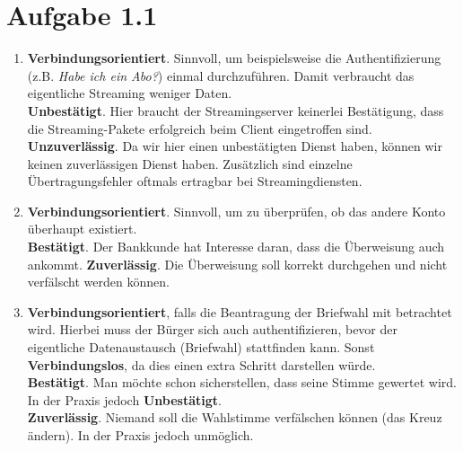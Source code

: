 \documentclass[12pt, a4paper]{article}
\begin{document}
\begin{center}\end{center}



\section*{Aufgabe 1.1}
\begin{enumerate}[label=\roman*)]
	\item	\textbf{Verbindungsorientiert}. Sinnvoll, um beispielsweise die Authentifizierung (z.B. \textit{Habe ich ein Abo?}) einmal durchzuführen. Damit verbraucht das eigentliche Streaming weniger Daten.\\
			\textbf{Unbestätigt}. Hier braucht der Streamingserver keinerlei Bestätigung, dass die Streaming-Pakete erfolgreich beim Client eingetroffen sind.\\
			\textbf{Unzuverlässig}. Da wir hier einen unbestätigten Dienst haben, können wir keinen zuverlässigen Dienst haben. Zusätzlich sind einzelne Übertragungsfehler oftmals ertragbar bei Streamingdiensten.
	
	\item	\textbf{Verbindungsorientiert}. Sinnvoll, um zu überprüfen, ob das andere Konto überhaupt existiert.\\
			\textbf{Bestätigt}. Der Bankkunde hat Interesse daran, dass die Überweisung auch ankommt.
			\textbf{Zuverlässig}. Die Überweisung soll korrekt durchgehen und nicht verfälscht werden können.
	
	\item	\textbf{Verbindungsorientiert}, falls die Beantragung der Briefwahl mit betrachtet wird. Hierbei muss der Bürger sich auch authentifizieren, bevor der eigentliche Datenaustausch (Briefwahl) stattfinden kann. Sonst \textbf{Verbindungslos}, da dies einen extra Schritt darstellen würde.\\
			\textbf{Bestätigt}. Man möchte schon sicherstellen, dass seine Stimme gewertet wird. In der Praxis jedoch \textbf{Unbestätigt}.\\
			\textbf{Zuverlässig}. Niemand soll die Wahlstimme verfälschen können (das Kreuz ändern). In der Praxis jedoch unmöglich.
\end{enumerate}
\end{document}
